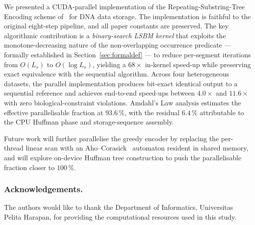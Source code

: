 \documentclass[runningheads]{llncs}
\begin{document}
We presented a CUDA-parallel implementation of the
Repeating-Substring-Tree Encoding scheme of~\cite{ref_rste} for DNA
data storage.  The implementation is faithful to the original
eight-step pipeline, and all paper constants are preserved.  The key
algorithmic contribution is a \emph{binary-search LSBM kernel} that
exploits the monotone-decreasing nature of the non-overlapping
occurrence predicate --- formally established in
Section~\ref{sec:formaldef} --- to reduce per-segment iterations from
$O(L_s)$ to $O(\log L_s)$, yielding a $68\times$ in-kernel speed-up
while preserving exact equivalence with the sequential algorithm.
Across four heterogeneous datasets, the parallel implementation produces
bit-exact identical output to a sequential reference and achieves
end-to-end speed-ups between $4.0\times$ and $11.6\times$ with zero
biological-constraint violations.  Amdahl's Law analysis estimates the
effective parallelisable fraction at $93.6\,\%$, with the residual
$6.4\,\%$ attributable to the CPU Huffman phase and storage-sequence
assembly.

Future work will further parallelise the greedy encoder by replacing
the per-thread linear scan with an Aho--Corasick~\cite{ref_acm1975}
automaton resident in shared memory, and will explore on-device
Huffman tree construction to push the parallelisable fraction closer
to $100\,\%$.

\subsubsection*{Acknowledgements.}
The authors would like to thank the Department of Informatics,
Universitas Pelita Harapan, for providing the computational
resources used in this study.
\end{document}
